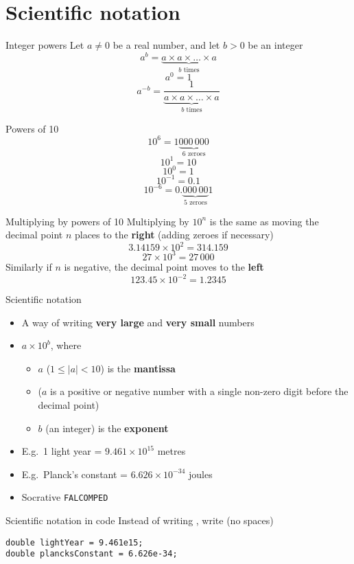 \part{Scientific notation}
\frame{\partpage}

\begin{frame}{Integer powers}
	Let $a \neq 0$ be a real number, and let $b > 0$ be an integer
	\pause
	$$ a^b = \underbrace{a \times a \times \dots \times a}_{\text{$b$ times}} $$
	\pause
	$$ a^0 = 1 $$
	\pause
	$$ a^{-b} = \underbrace{\frac{1}{a \times a \times \dots \times a}}_{\text{$b$ times}} $$
\end{frame}

\begin{frame}{Powers of 10}
	\pause
	$$ 10^6 = 1\underbrace{000\,000}_{\text{6 zeroes}} $$
	\pause
	$$ 10^1 = 10 $$
	\pause
	$$ 10^0 = 1 $$
	\pause
	$$ 10^{-1} = 0.1 $$
	\pause
	$$ 10^{-6} = 0.\underbrace{000\,00}_{\text{5 zeroes}}1 $$
\end{frame}

\begin{frame}{Multiplying by powers of 10}
	\pause
	Multiplying by $10^n$ is the same as moving the decimal point $n$ places to the \textbf{right}
	(adding zeroes if necessary)
	\pause
	$$ 3.14159 \times 10^2 = 314.159 $$
	\pause
	$$ 27 \times 10^3 = 27\,000 $$
	\pause
	Similarly if $n$ is negative, the decimal point moves to the \textbf{left}
	\pause
	$$ 123.45 \times 10^{-2} = 1.2345 $$
\end{frame}

\begin{frame}{Scientific notation}
	\begin{itemize}
		\pause\item A way of writing \textbf{very large} and \textbf{very small} numbers
		\pause\item $a \times 10^b$, where
			\begin{itemize}
				\pause\item $a$ ($1 \leq |a| < 10$) is the \textbf{mantissa}
				\pause\item ($a$ is a positive or negative number
					with a single non-zero digit before the decimal point)
				\pause\item $b$ (an integer) is the \textbf{exponent}
			\end{itemize}
		\pause\item E.g.\ 1 light year = $9.461 \times 10^{15}$ metres
		\pause\item E.g.\ Planck's constant = $6.626 \times 10^{-34}$ joules
		\pause\item Socrative \texttt{FALCOMPED}
	\end{itemize}
\end{frame}

\begin{frame}[fragile]{Scientific notation in code}
	\pause Instead of writing , write  (no spaces)
	\pause
	\begin{lstlisting}
double lightYear = 9.461e15;
double plancksConstant = 6.626e-34;
	\end{lstlisting}
\end{frame}

